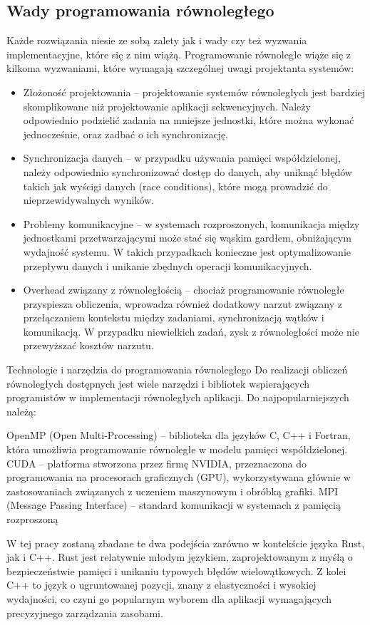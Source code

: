 \subsection{Wady programowania równoległego}
Każde rozwiązania niesie ze sobą zalety jak i wady czy też wyzwania implementacyjne, które się z nim wiążą. Programowanie równoległe wiąże się z kilkoma wyzwaniami, które wymagają szczególnej uwagi projektanta systemów:
\begin{itemize}
    \item Złożoność projektowania – projektowanie systemów równoległych jest bardziej skomplikowane niż projektowanie aplikacji sekwencyjnych. Należy odpowiednio podzielić zadania na mniejsze jednostki, które można wykonać jednocześnie, oraz zadbać o ich synchronizację.
    \item Synchronizacja danych – w przypadku używania pamięci współdzielonej, należy odpowiednio synchronizować dostęp do danych, aby uniknąć błędów takich jak wyścigi danych (race conditions), które mogą prowadzić do nieprzewidywalnych wyników.
    \item Problemy komunikacyjne – w systemach rozproszonych, komunikacja między jednostkami przetwarzającymi może stać się wąskim gardłem, obniżającym wydajność systemu. W takich przypadkach konieczne jest optymalizowanie przepływu danych i unikanie zbędnych operacji komunikacyjnych.
    \item Overhead związany z równoległością – chociaż programowanie równoległe przyspiesza obliczenia, wprowadza również dodatkowy narzut związany z przełączaniem kontekstu między zadaniami, synchronizacją wątków i komunikacją. W przypadku niewielkich zadań, zysk z równoległości może nie przewyższać kosztów narzutu.
\end{itemize}



Technologie i narzędzia do programowania równoległego
Do realizacji obliczeń równoległych dostępnych jest wiele narzędzi i bibliotek wspierających programistów w implementacji równoległych aplikacji. Do najpopularniejszych należą:

OpenMP (Open Multi-Processing) – biblioteka dla języków C, C++ i Fortran, która umożliwia programowanie równoległe w modelu pamięci współdzielonej.
CUDA – platforma stworzona przez firmę NVIDIA, przeznaczona do programowania na procesorach graficznych (GPU), wykorzystywana głównie w zastosowaniach związanych z uczeniem maszynowym i obróbką grafiki.
MPI (Message Passing Interface) – standard komunikacji w systemach z pamięcią rozproszoną

W tej pracy zostaną zbadane te dwa podejścia zarówno w kontekście języka Rust, jak i C++. Rust jest relatywnie młodym językiem, zaprojektowanym z myślą o bezpieczeństwie pamięci i unikaniu typowych błędów wielowątkowych. Z kolei C++ to język o ugruntowanej pozycji, znany z elastyczności i wysokiej wydajności, co czyni go popularnym wyborem dla aplikacji wymagających precyzyjnego zarządzania zasobami.

